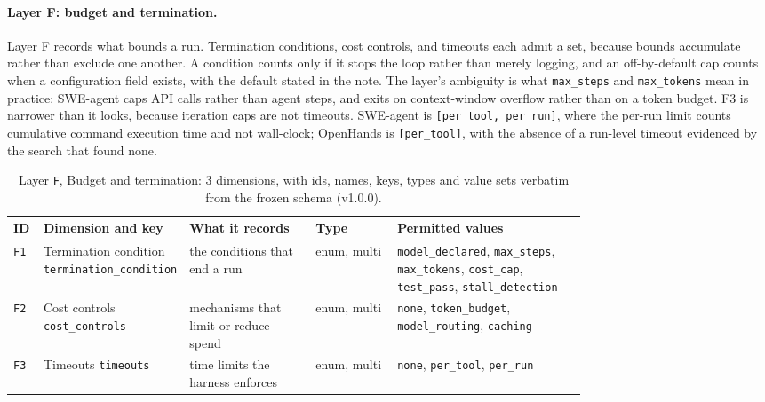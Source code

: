 \paragraph{Layer F: budget and termination.}\label{subsec:layer-f}
Layer F records what bounds a run. Termination conditions, cost controls, and timeouts each admit a
set, because bounds accumulate rather than exclude one another. A condition counts only if it stops the
loop rather than merely logging, and an off-by-default cap counts when a configuration field exists,
with the default stated in the note. The layer's ambiguity is what \texttt{max\_steps} and
\texttt{max\_tokens} mean in practice: SWE-agent caps API calls rather than agent steps, and exits on
context-window overflow rather than on a token budget. F3 is narrower than it looks, because iteration
caps are not timeouts. SWE-agent is \texttt{[per\_tool, per\_run]}, where the per-run limit counts
cumulative command execution time and not wall-clock; OpenHands is \texttt{[per\_tool]}, with the
absence of a run-level timeout evidenced by the search that found none.

\begin{table}[htbp]
\caption{Layer \texttt{F}, Budget and termination: 3 dimensions, with ids, names, keys, types and value
sets verbatim from the frozen schema (v1.0.0).}
\label{tab:coding-F}
\footnotesize
\begin{tabular}{@{}l p{0.20\linewidth} p{0.22\linewidth} l p{0.33\linewidth}@{}}
\toprule
ID & Dimension and key & What it records & Type & Permitted values \tabularnewline
\midrule
\texttt{F1} & \raggedright Termination condition \newline \texttt{termination\_condition} & \raggedright the conditions that end a run & enum, multi & \raggedright \texttt{model\_declared}, \texttt{max\_steps}, \texttt{max\_tokens}, \texttt{cost\_cap}, \texttt{test\_pass}, \texttt{stall\_detection} \tabularnewline
\texttt{F2} & \raggedright Cost controls \newline \texttt{cost\_controls} & \raggedright mechanisms that limit or reduce spend & enum, multi & \raggedright \texttt{none}, \texttt{token\_budget}, \texttt{model\_routing}, \texttt{caching} \tabularnewline
\texttt{F3} & \raggedright Timeouts \newline \texttt{timeouts} & \raggedright time limits the harness enforces & enum, multi & \raggedright \texttt{none}, \texttt{per\_tool}, \texttt{per\_run} \tabularnewline
\bottomrule
\end{tabular}
\end{table}

